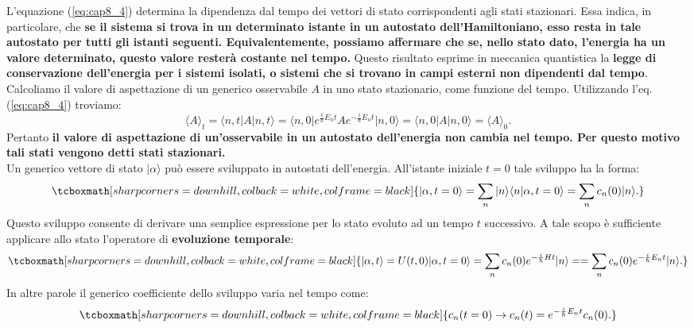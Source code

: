 L'equazione (\ref{eq:cap8_4}) determina la dipendenza dal tempo dei vettori di stato corrispondenti agli stati stazionari. Essa indica, in particolare, che \textbf{se il sistema si trova in un determinato istante in un autostato dell'Hamiltoniano, esso resta in tale autostato per tutti gli istanti seguenti. Equivalentemente, possiamo affermare che se, nello stato dato, l'energia ha un valore determinato, questo valore resterà costante nel tempo.} Questo risultato esprime in meccanica quantistica la \textbf{legge di conservazione dell'energia per i sistemi isolati, o sistemi che si trovano in campi esterni non dipendenti dal tempo}.\\

Calcoliamo il valore di aspettazione di un generico osservabile $A$ in uno stato stazionario, come funzione del tempo. Utilizzando l'eq.(\ref{eq:cap8_4}) troviamo:
	\begin{equation}
		\langle A \rangle _t = \langle n, t \vert A \vert n, t \rangle= \langle n, 0 \vert e^{\frac{i}{\hbar}E_n t}A e^{-\frac{i}{\hbar}E_n t}\vert n, 0 \rangle =\langle n, 0 \vert A \vert n, 0 \rangle = \langle A \rangle _0.
	\end{equation}
Pertanto \textbf{il valore di aspettazione di un'osservabile in un autostato dell'energia non cambia nel tempo. Per questo motivo tali stati vengono detti stati stazionari.}\\

Un generico vettore di stato $\vert \alpha \rangle $ può essere sviluppato in autostati dell'energia. All'istante iniziale $t=0$ tale sviluppo ha la forma:
	\begin{equation}
		\tcboxmath[sharp corners=downhill, colback=white, colframe=black]{
			\vert \alpha , t=0\rangle = \sum _n \vert n \rangle \langle n \vert \alpha, t=0 \rangle = \sum _n c_n(0)\vert n \rangle.
			}
	\end{equation}
Questo sviluppo consente di derivare una semplice espressione per lo stato evoluto ad un tempo $t$ successivo. A tale scopo è sufficiente applicare allo stato l'operatore di \textbf{evoluzione temporale}:
	\begin{equation}
		\tcboxmath[sharp corners=downhill, colback=white, colframe=black]{
			\vert \alpha, t \rangle = U (t,0)\vert \alpha, t=0 \rangle = \sum _n c_n (0) e^{-\frac{i}{\hbar}H t}  \vert n \rangle =  =\sum _n c_n (0) e^{-\frac{i}{\hbar}E_n t}  \vert n \rangle.
			}
	\end{equation}
In altre parole il generico coefficiente dello sviluppo varia nel tempo come:
	\begin{equation}
		\tcboxmath[sharp corners=downhill, colback=white, colframe=black]{
			c_n (t=0) \rightarrow c_n(t)=e^{-\frac{i}{\hbar}E_n t} c_n (0).
			}
	\end{equation}\\
	
